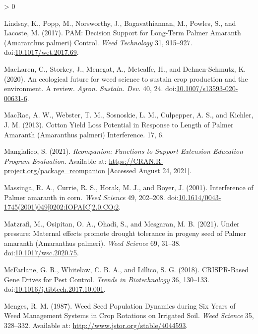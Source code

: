 \documentclass[utf8]{frontiersSCNS}
\newlength{\cslhangindent}
\newenvironment{CSLReferences}[2] %
 {%
  \setlength{\parindent}{0pt}
  \ifodd #1 \everypar{\setlength{\hangindent}{\cslhangindent}}\ignorespaces\fi
  \ifnum #2 > 0
  \setlength{\parskip}{#2\baselineskip}
  \fi
 }%
 {}
\begin{document}
\begin{CSLReferences}{1}{0}
\leavevmode\hypertarget{ref-lindsay2017}{}%
Lindsay, K., Popp, M., Norsworthy, J., Bagavathiannan, M., Powles, S.,
and Lacoste, M. (2017). {PAM}: {Decision Support} for {Long}-{Term
Palmer Amaranth} ({Amaranthus} palmeri) {Control}. \emph{Weed
Technology} 31, 915--927.
doi:\href{https://doi.org/10.1017/wet.2017.69}{10.1017/wet.2017.69}.

\leavevmode\hypertarget{ref-maclaren2020}{}%
MacLaren, C., Storkey, J., Menegat, A., Metcalfe, H., and
Dehnen-Schmutz, K. (2020). An ecological future for weed science to
sustain crop production and the environment. {A} review. \emph{Agron.
Sustain. Dev.} 40, 24.
doi:\href{https://doi.org/10.1007/s13593-020-00631-6}{10.1007/s13593-020-00631-6}.

\leavevmode\hypertarget{ref-macrae2013}{}%
MacRae, A. W., Webster, T. M., Sosnoskie, L. M., Culpepper, A. S., and
Kichler, J. M. (2013). Cotton {Yield Loss Potential} in {Response} to
{Length} of {Palmer Amaranth} ({Amaranthus} palmeri) {Interference}. 17,
6.

\leavevmode\hypertarget{ref-mangiafico2021}{}%
Mangiafico, S. (2021). \emph{Rcompanion: {Functions} to {Support
Extension Education Program Evaluation}}. Available at:
\url{https://CRAN.R-project.org/package=rcompanion} {[}Accessed August
24, 2021{]}.

\leavevmode\hypertarget{ref-massinga2001}{}%
Massinga, R. A., Currie, R. S., Horak, M. J., and Boyer, J. (2001).
Interference of {Palmer} amaranth in corn. \emph{Weed Science} 49,
202--208.
doi:\href{https://doi.org/10.1614/0043-1745(2001)049\%5B0202:IOPAIC\%5D2.0.CO;2}{10.1614/0043-1745(2001)049{[}0202:IOPAIC{]}2.0.CO;2}.

\leavevmode\hypertarget{ref-matzrafi2021}{}%
Matzrafi, M., Osipitan, O. A., Ohadi, S., and Mesgaran, M. B. (2021).
Under pressure: Maternal effects promote drought tolerance in progeny
seed of {Palmer} amaranth ({Amaranthus} palmeri). \emph{Weed Science}
69, 31--38.
doi:\href{https://doi.org/10.1017/wsc.2020.75}{10.1017/wsc.2020.75}.

\leavevmode\hypertarget{ref-mcfarlane2018}{}%
McFarlane, G. R., Whitelaw, C. B. A., and Lillico, S. G. (2018).
{CRISPR}-{Based Gene Drives} for {Pest Control}. \emph{Trends in
Biotechnology} 36, 130--133.
doi:\href{https://doi.org/10.1016/j.tibtech.2017.10.001}{10.1016/j.tibtech.2017.10.001}.

\leavevmode\hypertarget{ref-menges1987}{}%
Menges, R. M. (1987). Weed {Seed Population Dynamics} during {Six Years}
of {Weed Management Systems} in {Crop Rotations} on {Irrigated Soil}.
\emph{Weed Science} 35, 328--332. Available at:
\url{http://www.jstor.org/stable/4044593}.


\end{CSLReferences}
\end{document}
